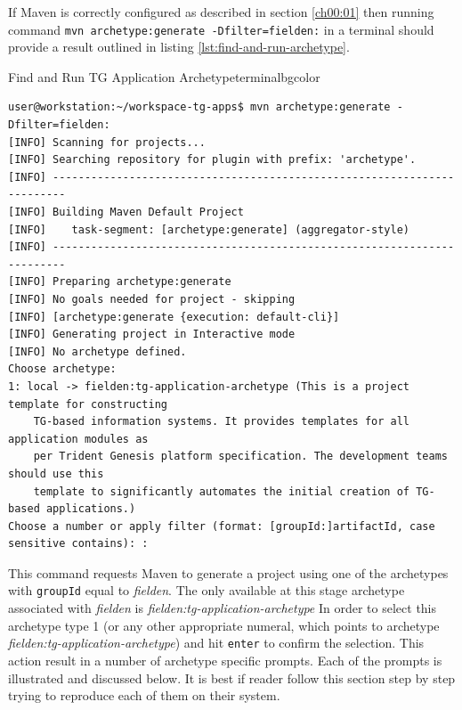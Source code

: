   If Maven is correctly configured as described in section \ref{ch00:01} then running command \texttt{mvn archetype:generate -Dfilter=fielden:} in a terminal should provide a result outlined in listing \ref{lst:find-and-run-archetype}.

  \begin{code}{Find and Run TG Application Archetype}{\label{lst:find-and-run-archetype}}{terminalbgcolor}
    \begin{lstlisting}
user@workstation:~/workspace-tg-apps$ mvn archetype:generate -Dfilter=fielden:
[INFO] Scanning for projects...
[INFO] Searching repository for plugin with prefix: 'archetype'.
[INFO] ------------------------------------------------------------------------
[INFO] Building Maven Default Project
[INFO]    task-segment: [archetype:generate] (aggregator-style)
[INFO] ------------------------------------------------------------------------
[INFO] Preparing archetype:generate
[INFO] No goals needed for project - skipping
[INFO] [archetype:generate {execution: default-cli}]
[INFO] Generating project in Interactive mode
[INFO] No archetype defined.
Choose archetype:
1: local -> fielden:tg-application-archetype (This is a project template for constructing 
	TG-based information systems. It provides templates for all application modules as 
	per Trident Genesis platform specification. The development teams should use this 
	template to significantly automates the initial creation of TG-based applications.)
Choose a number or apply filter (format: [groupId:]artifactId, case sensitive contains): : 
    \end{lstlisting}
  \end{code}

  This command requests Maven to generate a project using one of the archetypes with \texttt{groupId} equal to \emph{fielden}.
  The only available at this stage archetype associated with \emph{fielden} is \emph{fielden:tg-application-archetype}
  In order to select this archetype type 1 (or any other appropriate numeral, which points to archetype \emph{fielden:tg-application-archetype}) and hit \texttt{enter} to confirm the selection. 
  This action result in a number of archetype specific prompts. 
  Each of the prompts is illustrated and discussed below.
  It is best if reader follow this section step by step trying to reproduce each of them on their system.

